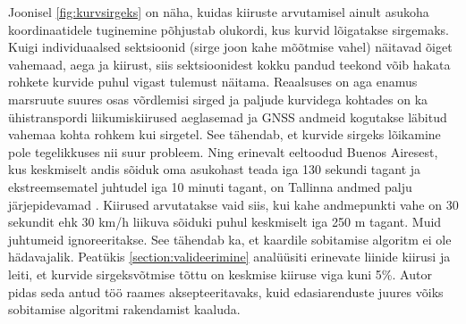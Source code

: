 Joonisel \ref{fig:kurvsirgeks} on näha, kuidas kiiruste arvutamisel ainult asukoha koordinaatidele tuginemine põhjustab olukordi, kus kurvid lõigatakse sirgemaks. Kuigi individuaalsed sektsioonid (sirge joon kahe mõõtmise vahel) näitavad õiget vahemaad, aega ja kiirust, siis sektsioonidest kokku pandud teekond võib hakata rohkete kurvide puhul vigast tulemust näitama. Reaalsuses on aga enamus marsruute suures osas võrdlemisi sirged  ja paljude kurvidega kohtades on ka ühistranspordi liikumiskiirused aeglasemad ja GNSS andmeid kogutakse läbitud vahemaa kohta rohkem kui sirgetel. See tähendab, et kurvide sirgeks lõikamine pole tegelikkuses nii suur probleem. Ning erinevalt eeltoodud Buenos Airesest, kus keskmiselt andis sõiduk oma asukohast teada iga 130 sekundi tagant ja ekstreemsematel juhtudel iga 10 minuti tagant, on Tallinna andmed palju järjepidevamad \cite{buenosAires}. Kiirused arvutatakse vaid siis, kui kahe andmepunkti vahe on 30 sekundit ehk 30 km/h liikuva sõiduki puhul keskmiselt iga 250 m tagant. Muid juhtumeid ignoreeritakse. See tähendab ka, et kaardile sobitamise algoritm ei ole hädavajalik. 
Peatükis \ref{section:valideerimine} analüüsiti erinevate liinide kiirusi ja leiti, et kurvide sirgeksvõtmise tõttu on keskmise kiiruse viga kuni 5\%. Autor pidas seda antud töö raames aksepteeritavaks, kuid edasiarenduste juures võiks sobitamise algoritmi rakendamist kaaluda.